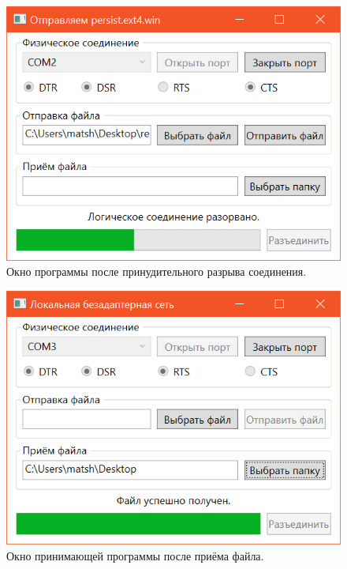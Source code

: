 \documentclass[a4paper,12pt]{article}
\begin{document}
\begin{figure}
\centering
\includegraphics{disc.png}
\caption{Окно программы после принудительного разрыва соединения.}\label{disc}
\end{figure}
\begin{figure}
\centering
\includegraphics{fin.png}
\caption{Окно принимающей программы после приёма файла.}\label{fin}
\end{figure}
\end{document}
